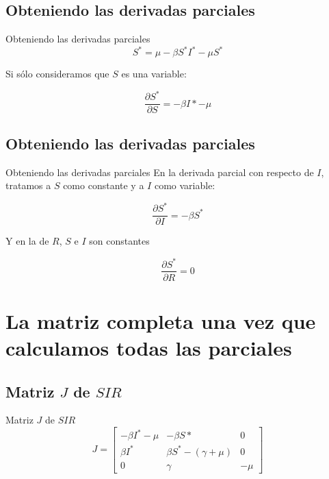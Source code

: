 \documentclass[
  11pt,
  ignorenonframetext,
]{beamer}
\begin{document}
\hypertarget{obteniendo-las-derivadas-parciales}{%
\subsection{Obteniendo las derivadas
parciales}\label{obteniendo-las-derivadas-parciales}}

\begin{frame}{Obteniendo las derivadas parciales}
\[S^* = \mu - \beta S^*I^* - \mu S^*\]

Si sólo consideramos que \(S\) es una variable:

\[\frac{\partial S^*}{\partial S} = -\beta I* - \mu\]
\end{frame}

\hypertarget{obteniendo-las-derivadas-parciales-1}{%
\subsection{Obteniendo las derivadas
parciales}\label{obteniendo-las-derivadas-parciales-1}}

\begin{frame}{Obteniendo las derivadas parciales}
En la derivada parcial con respecto de \(I\), tratamos a \(S\) como
constante y a \(I\) como variable:

\[\frac{\partial S^*}{\partial I} = -\beta S^*\]

Y en la de \(R\), \(S\) e \(I\) son constantes

\[\frac{\partial S^*}{\partial R} = 0\]
\end{frame}

\hypertarget{la-matriz-completa-una-vez-que-calculamos-todas-las-parciales}{%
\section{La matriz completa una vez que calculamos todas las
parciales}\label{la-matriz-completa-una-vez-que-calculamos-todas-las-parciales}}

\hypertarget{matriz-j-de-sir}{%
\subsection{\texorpdfstring{Matriz \(J\) de
\(SIR\)}{Matriz J de SIR}}\label{matriz-j-de-sir}}

\begin{frame}{Matriz \(J\) de \(SIR\)}
\begin{equation}
J = \left[
\begin{matrix}
-\beta I^* - \mu & - \beta S* &  0 \\
\beta I^* & \beta S^* - (\gamma + \mu) & 0 \\
0 & \gamma & -\mu
\end{matrix}
\right]
\end{equation}
\end{frame}
\end{document}
